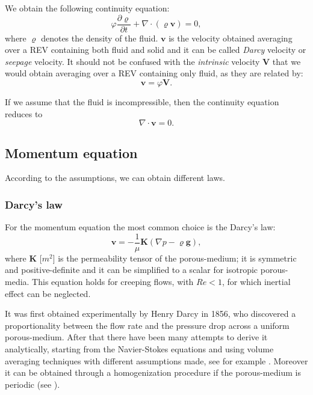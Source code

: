We obtain the following continuity equation:
\begin{equation}
\varphi\frac{\partial \varrho}{\partial t} + \nabla \cdot (\varrho 
\mathbf{v}) = 0,
\end{equation}
where $\varrho$ denotes the density of the fluid. $\mathbf{v}$ is the velocity 
obtained averaging over a REV containing both fluid and solid and it can be 
called \emph{Darcy} velocity or \emph{seepage} velocity. It should not be 
confused with the \emph{intrinsic} velocity $\mathbf{V}$ that we would obtain 
averaging over a REV containing only fluid, as they are related by:
\begin{equation}
	\mathbf{v} = \varphi \mathbf{V}.
\end{equation}

If we assume that the fluid is incompressible, then the continuity equation 
reduces to
\begin{equation} \label{eq:pmcontinuity}
\nabla \cdot \mathbf{v} = 0.
\end{equation}
%
\subsection{Momentum equation}
According to the assumptions, we can obtain different laws.
\subsubsection{Darcy's law}
For the momentum equation the most common choice is the Darcy's law:
\begin{equation} \label{eq:darcy}
	\mathbf{v} = -\frac{1}{\mu}\mathbf{K} (\nabla p - \varrho \mathbf{g}),
\end{equation}
where $\mathbf{K}$ [$\si{m^2}$] is the permeability tensor of the 
porous-medium; it is symmetric and positive-definite and it can be simplified 
to a scalar for isotropic porous-media. 
This equation holds for creeping flows, with $Re < 1$, for which 
inertial effect can be neglected.

It was first obtained experimentally by Henry Darcy in 1856, who discovered a 
proportionality between the flow rate and the pressure drop across a uniform 
porous-medium. After that there have been many attempts to derive it analytically, 
starting from the Navier-Stokes equations and using volume averaging techniques 
with different assumptions made, see for example \cite{volaver:ithakerdarcy}. 
Moreover it can be obtained through a homogenization procedure if the 
porous-medium is periodic (see \cite{homo:holmes}).

